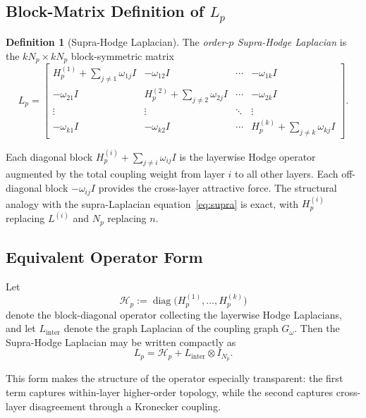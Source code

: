 \documentclass[11pt]{article}
\theoremstyle{definition}
\newtheorem{definition}[theorem]{Definition}
\theoremstyle{remark}
\newcommand{\Gom}{G_\omega}
\DeclareMathOperator{\diag}{diag}
\begin{document}
\subsection{\texorpdfstring{Block-Matrix Definition of $L_p$}{Block-Matrix Definition of L\_p}}

\begin{definition}[Supra-Hodge Laplacian]
\label{def:main}
The \emph{order-$p$ Supra-Hodge Laplacian} is the $kN_p\times kN_p$
block-symmetric matrix
\begin{equation}
  \label{eq:Lp}
  L_p =
  \begin{bmatrix}
    H_p^{(1)} + \textstyle\sum_{j\neq 1}\omega_{1j}I & -\omega_{12}I & \cdots & -\omega_{1k}I\\
    -\omega_{21}I & H_p^{(2)} + \textstyle\sum_{j\neq 2}\omega_{2j}I & \cdots & -\omega_{2k}I\\
    \vdots & \vdots & \ddots & \vdots\\
    -\omega_{k1}I & -\omega_{k2}I & \cdots & H_p^{(k)} + \textstyle\sum_{j\neq k}\omega_{kj}I
  \end{bmatrix}.
\end{equation}
\end{definition}

Each diagonal block $H_p^{(i)}+\sum_{j\neq i}\omega_{ij}I$ is the layerwise
Hodge operator augmented by the total coupling weight from layer $i$ to all
other layers. Each off-diagonal block $-\omega_{ij}I$ provides the cross-layer
attractive force. The structural analogy with the supra-Laplacian
equation~\eqref{eq:supra} is exact, with $H_p^{(i)}$ replacing $L^{(i)}$ and
$N_p$ replacing $n$.

\subsection{Equivalent Operator Form}

Let
\[
\mathcal{H}_p := \diag\!\bigl(H_p^{(1)},\dots,H_p^{(k)}\bigr)
\]
denote the block-diagonal operator collecting the layerwise Hodge Laplacians, and let $L_{\mathrm{inter}}$ denote the graph Laplacian of the coupling graph $\Gom$. Then the Supra-Hodge Laplacian may be written compactly as
\[
L_p = \mathcal{H}_p + L_{\mathrm{inter}} \otimes I_{N_p}.
\]

This form makes the structure of the operator especially transparent: the first term captures within-layer higher-order topology, while the second captures cross-layer disagreement through a Kronecker coupling.
\end{document}

